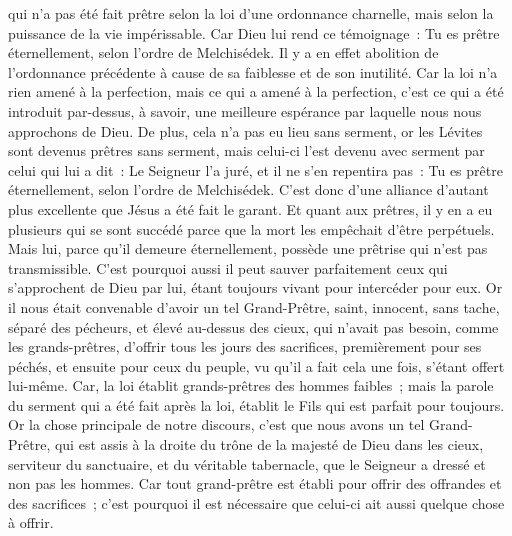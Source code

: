 \begin{multicols}{2}
qui n'a pas été fait prêtre selon la loi d'une ordonnance charnelle, mais selon la puissance de la vie impérissable.
Car Dieu lui rend ce témoignage~: Tu es prêtre éternellement, selon l'ordre de Melchisédek.
Il y a en effet abolition de l'ordonnance précédente à cause de sa faiblesse et de son inutilité.
Car la loi n’a rien amené à la perfection, mais ce qui a amené à la perfection, c'est ce qui a été introduit par-dessus, à savoir, une meilleure espérance par laquelle nous nous approchons de Dieu.
De plus, cela n'a pas eu lieu sans serment, 
or les Lévites sont devenus prêtres sans serment, mais celui-ci l'est devenu avec serment par celui qui lui a dit~: Le Seigneur l'a juré, et il ne s'en repentira pas~: Tu es prêtre éternellement, selon l'ordre de Melchisédek.
C'est donc d'une alliance d'autant plus excellente que Jésus a été fait le garant.
Et quant aux prêtres, il y en a eu plusieurs qui se sont succédé parce que la mort les empêchait d'être perpétuels.
Mais lui, parce qu'il demeure éternellement, possède une prêtrise qui n'est pas transmissible.
C'est pourquoi aussi il peut sauver parfaitement ceux qui s'approchent de Dieu par lui, étant toujours vivant pour intercéder pour eux.
Or il nous était convenable d'avoir un tel Grand-Prêtre, saint, innocent, sans tache, séparé des pécheurs, et élevé au-dessus des cieux,
qui n'avait pas besoin, comme les grands-prêtres, d'offrir tous les jours des sacrifices, premièrement pour ses péchés, et ensuite pour ceux du peuple, vu qu'il a fait cela une fois, s'étant offert lui-même.
Car, la loi établit grands-prêtres des hommes faibles~; mais la parole du serment qui a été fait après la loi, établit le Fils qui est parfait pour toujours.
\VerseOne{}Or la chose principale de notre discours, c'est que nous avons un tel Grand-Prêtre, qui est assis à la droite du trône de la majesté de Dieu dans les cieux,
serviteur du sanctuaire, et du véritable tabernacle, que le Seigneur a dressé et non pas les hommes.
Car tout grand-prêtre est établi pour offrir des offrandes et des sacrifices~; c'est pourquoi il est nécessaire que celui-ci ait aussi quelque chose à offrir.

\end{multicols}
